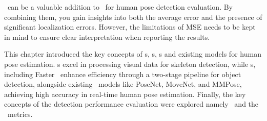 \MSE\ can be a valuable addition to \APE\ for human pose detection evaluation. By combining them, you gain insights into both the average error and the presence of significant localization errors. However, the limitations of MSE needs to be kept in mind to ensure clear interpretation when reporting the results.

This chapter introduced the key concepts of \NN\-s, \CNN\-s, \RCNN\-s and existing models for human pose estimation. \CNN\-s excel in processing visual data for skeleton detection, while \RCNN\-s, including Faster \RCNN\, enhance efficiency through a two-stage pipeline for object detection, alongside existing \NN\ models like PoseNet, MoveNet, and MMPose, achieving high accuracy in real-time human pose estimation. Finally, the key concepts of the detection performance evaluation were explored namely \APE\ and the \MSE\ metrics.

